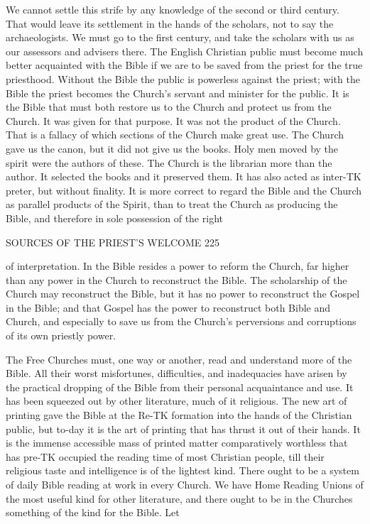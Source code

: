 \documentclass[12pt,a5paper,twoside]{book}
\begin{document}
{{We cannot settle this strife by any knowledge of 
the second or third century. That would leave its 
settlement in the hands of the scholars, not to say 
the archaeologists. We must go to the first century, 
and take the scholars with us as our assessors and 
advisers there. The English Christian public must 
become much better acquainted with the Bible if we 
are to be saved from the priest for the true priesthood. 
Without the Bible the public is powerless against the 
priest; with the Bible the priest becomes the Church's 
servant and minister for the public. It is the Bible 
that must both restore us to the Church and protect 
us from the Church. It was given for that purpose. 
It was not the product of the Church. That is a 
fallacy of which sections of the Church make great 
use. The Church gave us the canon, but it did not 
give us the books. Holy men moved by the spirit 
were the authors of these. The Church is the 
librarian more than the author. It selected the books 
and it preserved them. It has also acted as inter-TK
preter, but without finality. It is more correct to 
regard the Bible and the Church as parallel products 
of the Spirit, than to treat the Church as producing 
the Bible, and therefore in sole possession of the right 



SOURCES OF THE PRIEST'S WELCOME 225 

of interpretation. In the Bible resides a power to 
reform the Church, far higher than any power in the 
Church to reconstruct the Bible. The scholarship of 
the Church may reconstruct the Bible, but it has no 
power to reconstruct the Gospel in the Bible; and 
that Gospel has the power to reconstruct both Bible 
and Church, and especially to save us from the 
Church's perversions and corruptions of its own 
priestly power. 

The Free Churches must, one way or another, 
read and understand more of the Bible. All their 
worst misfortunes, difficulties, and inadequacies have 
arisen by the practical dropping of the Bible from 
their personal acquaintance and use. It has been 
squeezed out by other literature, much of it religious. 
The new art of printing gave the Bible at the Re-TK
formation into the hands of the Christian public, but 
to-day it is the art of printing that has thrust it out of 
their hands. It is the immense accessible mass of 
printed matter comparatively worthless that has pre-TK
occupied the reading time of most Christian people, 
till their religious taste and intelligence is of the 
lightest kind. There ought to be a system of daily 
Bible reading at work in every Church. We have 
Home Reading Unions of the most useful kind for 
other literature, and there ought to be in the 
Churches something of the kind for the Bible. Let 

}}
\end{document}
